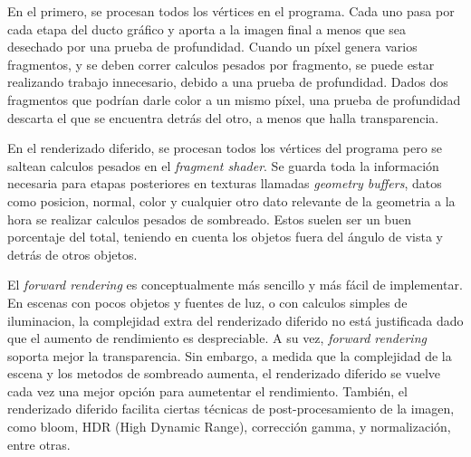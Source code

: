 En el primero, se procesan todos los vértices en el programa.
Cada uno pasa por cada etapa del ducto gráfico y aporta a la imagen final a menos que sea desechado por una prueba de profundidad.
Cuando un píxel genera varios fragmentos, y se deben correr calculos pesados por fragmento, se puede estar realizando trabajo innecesario, debido a una prueba de profundidad.
Dados dos fragmentos que podrían darle color a un mismo píxel, una prueba de profundidad descarta el que se encuentra detrás del otro, a menos que halla transparencia.

En el renderizado diferido, se procesan todos los vértices del programa pero se saltean calculos pesados en el \textit{fragment shader}.
Se guarda toda la información necesaria para etapas posteriores en texturas llamadas \textit{geometry buffers}, datos como posicion, normal, color y cualquier otro dato relevante de la geometria a la hora se realizar calculos pesados de sombreado.
Estos suelen ser un buen porcentaje del total, teniendo en cuenta los objetos fuera del ángulo de vista y detrás de otros objetos.

El \textit{forward rendering} es conceptualmente más sencillo y más fácil de implementar.
En escenas con pocos objetos y fuentes de luz, o con calculos simples de iluminacion, la complejidad extra del renderizado diferido no está justificada dado que el aumento de rendimiento es despreciable.
A su vez, \textit{forward rendering} soporta mejor la transparencia.
Sin embargo, a medida que la complejidad de la escena y los metodos de sombreado aumenta, el renderizado diferido se vuelve cada vez una mejor opción para aumetentar el rendimiento.
También, el renderizado diferido facilita ciertas técnicas de post-procesamiento de la imagen, como bloom, HDR (High Dynamic Range), corrección gamma, y normalización, entre otras.



